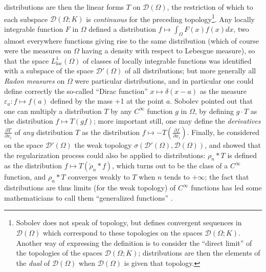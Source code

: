 \documentclass[12pt,a4paper,leqno,twoside]{extbook}
\newcommand{\pder}[2]{\frac{\partial #1}{\partial #2}}
\begin{document}
distributions are then the linear forms \(T\) on \(\mathcal{D}(\Omega)\), the restriction of which to each subspace \(\mathcal{D}(\Omega; K)\) is \emph{continuous} for the preceding topology\footnote{Sobolev does not speak of topology, but defines convergent sequences in \(\mathcal{D}(\Omega)\) which correspond to these topologies on the spaces \(\mathcal{D}(\Omega; K)\). Another way of expressing the definition is to consider the ``direct limit'' of the topologies of the spaces \(\mathcal{D}(\Omega; K)\); distributions are then the elements of the \emph{dual} of \(\mathcal{D}(\Omega)\) when \(\mathcal{D}(\Omega)\) is given that topology.}. Any locally integrable function \(F\) in \(\Omega\) defined a distribution \(f \mapsto \int_\Omega F(x)f(x)dx\), two almost everywhere functions giving rise to the same distribution (which of course were the measures on \(\Omega\) having a density with respect to Lebesgue measure), so that the space \(L^1_\text{loc}(\Omega)\) of classes of locally integrable functions was identified with a subspace of the space \(\mathcal{D}'(\Omega)\) of all distributions; but more generally all \emph{Radon measures} on \(\Omega\) were particular distributions, and in particular one could define correctly the so-called ``Dirac function'' \(x \mapsto \delta(x-a)\) as the measure \(\varepsilon_a: f \mapsto f(a)\) defined by the mass +1 at the point \(a\). Sobolev pointed out that one can multiply a distribution \(T\) by any \(C^\infty\) function \(g\) in \(\Omega\), by defining \(g \cdot T\) as the distribution \(f \mapsto T(gf)\); more important still, one may define the \emph{derivatives} \(\pder{T}{x_i}\) of \emph{any} distribution \(T\) as the distribution \(f \mapsto -T\left(\pder{f}{x_i}\right)\). Finally, he considered on the space \(\mathcal{D}'(\Omega)\) the weak topology \(\sigma(\mathcal{D}'(\Omega), \mathcal{D}(\Omega))\), and showed that the regularization process could also be applied to distributions: \(\rho_n * T\) is defined as the distribution \(f \mapsto T(\check{\rho}_n * f)\), which turns out to be the class of a \(C^\infty\) function, and \(\rho_n*T\) converges weakly to \(T\) when \(n\) tends to \(+\infty\); the fact that distributions are thus limits (for the weak topology) of \(C^\infty\) functions has led some mathematicians to call them ``generalized functions'' \cite{086}.
\end{document}
